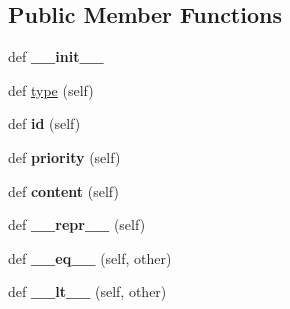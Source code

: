 \subsection*{Public Member Functions}
\begin{DoxyCompactItemize}
\item 
\hypertarget{classopt__neuron_1_1util_1_1Message_a376cf143778d5ed3cefd3c7dcc1fbc40}{}def {\bfseries \+\_\+\+\_\+init\+\_\+\+\_\+}\label{classopt__neuron_1_1util_1_1Message_a376cf143778d5ed3cefd3c7dcc1fbc40}

\item 
def \hyperlink{classopt__neuron_1_1util_1_1Message_ae0ff9396bfe89407875ce4892e049993}{type} (self)
\item 
\hypertarget{classopt__neuron_1_1util_1_1Message_afd67ea4cba1d4fbab576f0390fcdf26c}{}def {\bfseries id} (self)\label{classopt__neuron_1_1util_1_1Message_afd67ea4cba1d4fbab576f0390fcdf26c}

\item 
\hypertarget{classopt__neuron_1_1util_1_1Message_a14ba24a31153719e086c62c09a2b595d}{}def {\bfseries priority} (self)\label{classopt__neuron_1_1util_1_1Message_a14ba24a31153719e086c62c09a2b595d}

\item 
\hypertarget{classopt__neuron_1_1util_1_1Message_ace24c823ca2e199b6a5a4f76a8d8e8cf}{}def {\bfseries content} (self)\label{classopt__neuron_1_1util_1_1Message_ace24c823ca2e199b6a5a4f76a8d8e8cf}

\item 
\hypertarget{classopt__neuron_1_1util_1_1Message_aa5d6f183c7fe764bb9fedd50efd722be}{}def {\bfseries \+\_\+\+\_\+repr\+\_\+\+\_\+} (self)\label{classopt__neuron_1_1util_1_1Message_aa5d6f183c7fe764bb9fedd50efd722be}

\item 
\hypertarget{classopt__neuron_1_1util_1_1Message_a08b095ada3d0f88ce43b444d975ec118}{}def {\bfseries \+\_\+\+\_\+eq\+\_\+\+\_\+} (self, other)\label{classopt__neuron_1_1util_1_1Message_a08b095ada3d0f88ce43b444d975ec118}

\item 
\hypertarget{classopt__neuron_1_1util_1_1Message_a87492c040e73da9af2b600b47ce2ffa0}{}def {\bfseries \+\_\+\+\_\+lt\+\_\+\+\_\+} (self, other)\label{classopt__neuron_1_1util_1_1Message_a87492c040e73da9af2b600b47ce2ffa0}

\end{DoxyCompactItemize}
